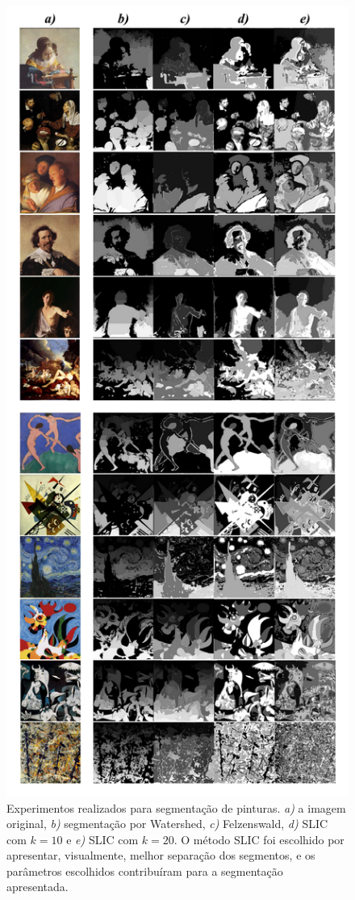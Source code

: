 \begin{figure}[ht!]
\begin{center}
        \includegraphics[scale=.3]{figs/expsegs}
      \caption{Experimentos realizados para segmentação de pinturas. \textit{a)}
        a imagem original, \textit{b)} segmentação por Watershed, \textit{c)}
        Felzenswald, \textit{d)} SLIC com $k=10$ e \textit{e)} SLIC com
        $k=20$. O método SLIC foi escolhido por apresentar, visualmente,
        melhor separação dos segmentos, e os parâmetros escolhidos contribuíram
        para a segmentação apresentada.  }
        \label{fig:expsegs}
\end{center}
\end{figure}

